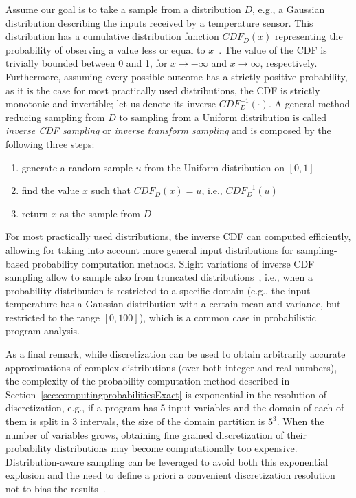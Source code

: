 Assume our goal is to take a sample from a distribution $D$, e.g., a Gaussian distribution describing the inputs received by a temperature sensor. This distribution has a cumulative distribution function $CDF_D(x)$ representing the probability of observing a value less or equal to $x$~\cite{pestman1998mathematical}. The value of the CDF is trivially bounded between 0 and 1, for $x\to -\infty$ and $x \to \infty$, respectively. Furthermore, assuming every possible outcome has a strictly positive probability, as it is the case for most practically used distributions, the CDF is strictly monotonic and invertible; let us denote its inverse $CDF_D^{-1}(\cdot)$. A general method reducing sampling from $D$ to sampling from a Uniform distribution is called \emph{inverse CDF sampling} or \emph{inverse transform sampling} and is composed by the following three steps:

\begin{enumerate}
	\item generate a random sample $u$ from the Uniform distribution on $[0,1]$
	\item find the value $x$ such that $CDF_D(x)=u$, i.e., $CDF_D^{-1}(u)$
	\item return $x$ as the sample from $D$
\end{enumerate}

For most practically used distributions, the inverse CDF can computed efficiently, allowing for taking into account more general input distributions for sampling-based probability computation methods. Slight variations of inverse CDF sampling allow to sample also from truncated distributions~\cite{cohen1991truncated}, i.e., when a probability distribution is restricted to a specific domain (e.g., the input temperature has a Gaussian distribution with a certain mean and variance, but restricted to the range $[0,100]$), which is a common case in probabilistic program analysis.

As a final remark, while discretization can be used to obtain arbitrarily accurate approximations of complex distributions (over both integer and real numbers), the complexity of the probability computation method described in Section~\ref{sec:computingprobabilitiesExact} is exponential in the resolution of discretization, e.g., if a program has 5 input variables and the domain of each of them is split in 3 intervals, the size of the domain partition is $5^3$. When the number of variables grows, obtaining fine grained discretization of their probability distributions may become computationally too expensive. Distribution-aware sampling can be leveraged to avoid both this exponential explosion and the need to define a priori a convenient discretization resolution not to bias the results~\cite{2015-fse-qcoral}.


